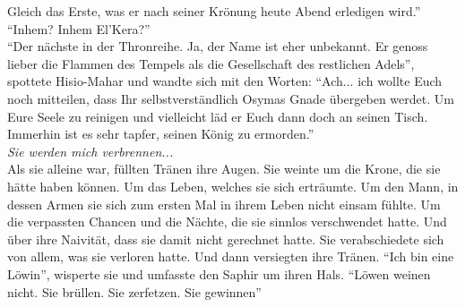 Gleich das Erste, was er nach seiner Krönung heute Abend erledigen wird.''\\
``Inhem? Inhem El'Kera?''\\
``Der nächste in der Thronreihe. Ja, der Name ist eher unbekannt. Er genoss lieber die Flammen des 
Tempels als die Gesellschaft des restlichen Adels'', spottete Hisio-Mahar und wandte sich mit den 
Worten: ``Ach... ich wollte Euch noch mitteilen, dass Ihr selbstverständlich Osymas Gnade übergeben 
werdet. Um Eure Seele zu reinigen und vielleicht läd er Euch dann doch an seinen Tisch. Immerhin 
ist es sehr tapfer, seinen König zu ermorden.''\\
\textit{Sie werden mich verbrennen...}\\
Als sie alleine war, füllten Tränen ihre Augen. Sie weinte um die Krone, die sie hätte haben 
können. Um das Leben, welches sie sich erträumte. Um den Mann, in dessen Armen sie sich zum ersten 
Mal in ihrem Leben nicht einsam fühlte. Um die verpassten Chancen und die Nächte, die sie sinnlos 
verschwendet hatte. Und über ihre Naivität, dass sie damit nicht gerechnet hatte. Sie 
verabschiedete sich von allem, was sie verloren hatte. Und dann versiegten ihre Tränen. ``Ich bin 
eine Löwin'', wisperte sie und umfasste den Saphir um ihren Hals. ``Löwen weinen nicht. Sie 
brüllen. Sie zerfetzen. Sie gewinnen''\\


